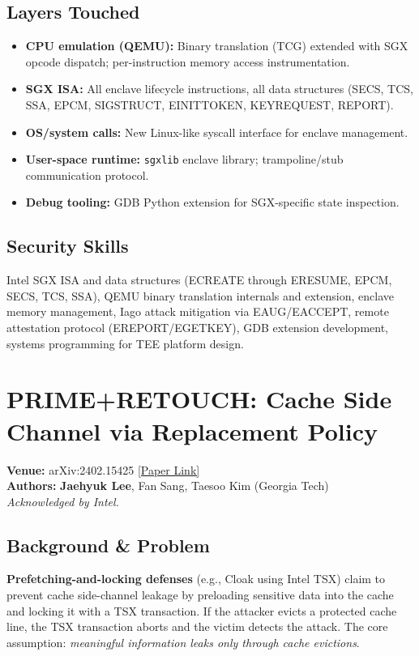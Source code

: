 \documentclass[11pt,letterpaper]{article}
\begin{document}
\subsection*{Layers Touched}
\begin{itemize}
    \item \textbf{CPU emulation (QEMU):} Binary translation (TCG) extended with SGX opcode dispatch; per-instruction memory access instrumentation.
    \item \textbf{SGX ISA:} All enclave lifecycle instructions, all data structures (SECS, TCS, SSA, EPCM, SIGSTRUCT, EINITTOKEN, KEYREQUEST, REPORT).
    \item \textbf{OS/system calls:} New Linux-like syscall interface for enclave management.
    \item \textbf{User-space runtime:} \texttt{sgxlib} enclave library; trampoline/stub communication protocol.
    \item \textbf{Debug tooling:} GDB Python extension for SGX-specific state inspection.
\end{itemize}

\subsection*{Security Skills}
Intel SGX ISA and data structures (ECREATE through ERESUME, EPCM, SECS, TCS, SSA), QEMU binary translation internals and extension, enclave memory management, Iago attack mitigation via EAUG/EACCEPT, remote attestation protocol (EREPORT/EGETKEY), GDB extension development, systems programming for TEE platform design.

\newpage

\section{PRIME+RETOUCH: Cache Side Channel via Replacement Policy}
\textbf{Venue:} arXiv:2402.15425 \hfill
\href{https://arxiv.org/abs/2402.15425}{[Paper Link]}\\
\textbf{Authors:} \textbf{Jaehyuk Lee}, Fan Sang, Taesoo Kim (Georgia Tech)\\
\emph{Acknowledged by Intel.}

\subsection*{Background \& Problem}
\textbf{Prefetching-and-locking defenses} (e.g., Cloak using Intel TSX) claim to prevent cache side-channel leakage by preloading sensitive data into the cache and locking it with a TSX transaction.
If the attacker evicts a protected cache line, the TSX transaction aborts and the victim detects the attack.
The core assumption: \emph{meaningful information leaks only through cache evictions}.
\end{document}
